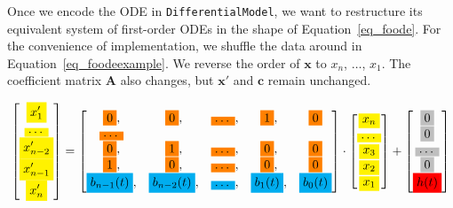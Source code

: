 Once we encode the ODE in \verb|DifferentialModel|, we want to restructure its equivalent system of first-order ODEs in the shape of Equation~\ref{eq_foode}. For the convenience of implementation, we shuffle the data around in Equation~\ref{eq_foodeexample}. We reverse the order of $\boldsymbol{x}$ to $x_{n}$, $\dots$, $x_{1}$. The coefficient matrix $\boldsymbol{A}$ also changes, but $\boldsymbol{x'}$ and $\boldsymbol{c}$ remain unchanged.

\begin{equation} \label{eq_foodeexamplecolor}
	\begin{bmatrix}
		\highlight{yellow}{x_{1}'} \\
    \highlight{yellow}{\dots} \\
    \highlight{yellow}{x_{n-2}'} \\
    \highlight{yellow}{x_{n-1}'} \\
    \highlight{yellow}{x_{n}'}
	\end{bmatrix}
    = 
  \begin{bmatrix}
		\highlight{orange}{0}, & \highlight{orange}{0}, & \highlight{orange}{\dots}, & \highlight{orange}{1}, & \highlight{orange}{0} \\
    \highlight{orange}{\dots} \\
    \highlight{orange}{0}, & \highlight{orange}{1}, & \highlight{orange}{\dots}, & \highlight{orange}{0}, & \highlight{orange}{0} \\
    \highlight{orange}{1}, & \highlight{orange}{0}, & \highlight{orange}{\dots}, & \highlight{orange}{0}, & \highlight{orange}{0} \\
    \highlight{cyan}{b_{n-1}(t)}, & \highlight{cyan}{b_{n-2}(t)}, & \highlight{cyan}{\dots}, & \highlight{cyan}{b_{1}(t)}, & \highlight{cyan}{b_{0}(t)}
	\end{bmatrix}
    \cdot
  \begin{bmatrix}
    \highlight{yellow}{x_{n}} \\
    \highlight{yellow}{\dots} \\
    \highlight{yellow}{x_{3}} \\
		\highlight{yellow}{x_{2}} \\
    \highlight{yellow}{x_{1}}
	\end{bmatrix}
    + 
  \begin{bmatrix}
    \highlight{lightgray}{0} \\
    \highlight{lightgray}{0} \\
    \highlight{lightgray}{\dots} \\
    \highlight{lightgray}{0} \\
    \highlight{red}{h(t)}
	\end{bmatrix}
\end{equation}


